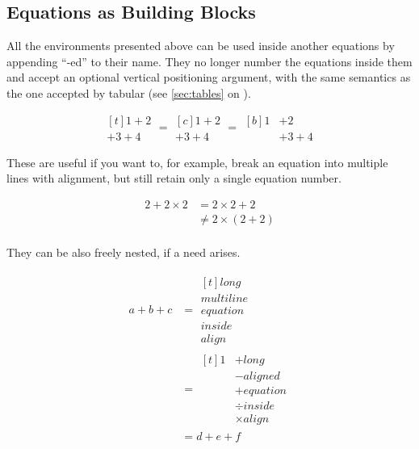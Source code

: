 \subsection{Equations as Building Blocks}

All the environments presented above can be used inside another equations by
appending \enquote{-ed} to their name. They no longer number the equations
inside them and accept an optional vertical positioning argument, with the
same semantics as the one accepted by tabular (see \autoref{sec:tables} on
).
\begin{example}
\[
  \begin{multlined}[t]
    1 + 2 \\
    + 3 + 4
  \end{multlined} =
  \begin{gathered}[c]
    1 + 2 \\
    + 3 + 4
  \end{gathered} =
  \begin{aligned}[b]
    1 & + 2 \\
      & + 3 + 4
  \end{aligned}
\]
\end{example}
These are useful if you want to, for example, break an equation into multiple
lines with alignment, but still retain only a single equation number.
\begin{example}
\begin{equation}
  \begin{aligned}
    2 + 2 \times 2 
      &= 2 \times 2 + 2 \\ 
      &\neq 2 \times (2 + 2) \\ 
  \end{aligned}
\end{equation}
\end{example}
They can be also freely nested, if a need arises.
\begin{example}
\begin{align}
  a + b + c
    &= \begin{multlined}[t]
      long \\
      multiline \\
      equation \\
      inside \\
      align
    \end{multlined} \\
    &= \begin{aligned}[t]
      1 &+ long \\
        &- aligned \\
        &+ equation \\
        &\div inside \\
        &\times align
    \end{aligned} \\
    &= d + e + f
\end{align}
\end{example}

